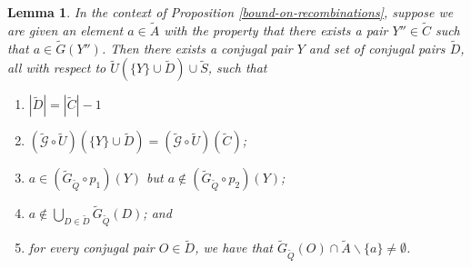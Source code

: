 \documentclass[12pt]{amsbook}
\theoremstyle{plain}
\newtheorem{lemma}{Lemma}
\theoremstyle{definition}
\theoremstyle{remark}
\newcommand{\set}{\tilde}
\newcommand{\genfun}{\tilde{\mathcal{G}}}
\newcommand{\paren}[1]{\left(#1\right)}
\begin{document}
\begin{lemma}
\label{directed-gaussian-elimination-of-logicals}
In the context of Proposition \ref{bound-on-recombinations}, suppose we are given an element $a\in \set A$ with the property that there exists a pair $Y''\in\set C$ such that $a\in\set G(Y'')$. Then there exists a conjugal pair $Y$ and set of conjugal pairs $\set D$, all with respect to $\set U\paren{\{Y\}\cup \set D} \cup \set S$, such that
\begin{enumerate}
\item $|\set D| = |\set C|-1$
\item $(\genfun\circ\set U)(\{Y\}\cup \set D)=(\genfun\circ\set U)(\set C)$;
\item $a\in (\set G_{\set Q}\circ p_1)(Y)$ but $a\notin (\set G_{\set Q}\circ p_2)(Y)$;
\item $a\notin \bigcup_{D\in \set D} \set G_{\set Q}(D)$; and
\item for every conjugal pair $O\in\set D$, we have that $\set G_{\set Q}(O) \cap \set A\backslash \{a\} \ne \emptyset$.
\end{enumerate}
\end{lemma}
\end{document}
